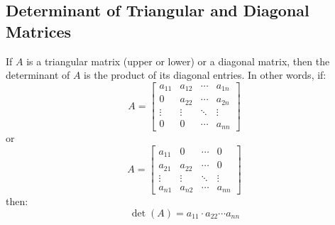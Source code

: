 \subsection{Determinant of Triangular and Diagonal Matrices}
\begin{theorem}
    If $A$ is a triangular matrix (upper or lower) or a diagonal matrix, then the determinant of $A$ is the product of its diagonal entries. In other words, if:
    \[
        A = \begin{bmatrix}
            a_{11} & a_{12} & \cdots & a_{1n} \\
            0 & a_{22} & \cdots & a_{2n} \\
            \vdots & \vdots & \ddots & \vdots \\
            0 & 0 & \cdots & a_{nn}
        \end{bmatrix}
    \]
    or
    \[
        A = \begin{bmatrix}
            a_{11} & 0 & \cdots & 0 \\
            a_{21} & a_{22} & \cdots & 0 \\
            \vdots & \vdots & \ddots & \vdots \\
            a_{n1} & a_{n2} & \cdots & a_{nn}
        \end{bmatrix}
    \]
    then:
    \[
        \det(A) = a_{11} \cdot a_{22} \cdots a_{nn}
    \]
\end{theorem}
